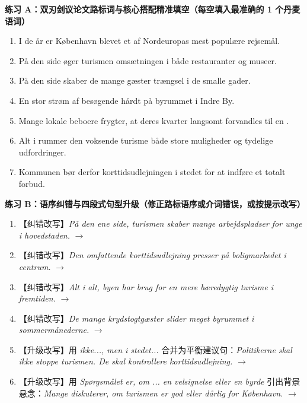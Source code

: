 \textbf{练习 A：双刃剑议论文路标词与核心搭配精准填空（每空填入最准确的 1 个丹麦语词）}
\begin{enumerate}
  \item I de \underline{\hspace{2.2cm}} år er København blevet et af Nordeuropas mest populære rejsemål.
  \item På den \underline{\hspace{2.2cm}} side øger turismen omsætningen i både restauranter og museer.
  \item På den \underline{\hspace{2.2cm}} side skaber de mange gæster trængsel i de smalle gader.
  \item En stor strøm af besøgende \underline{\hspace{2.2cm}} hårdt på byrummet i Indre By.
  \item Mange lokale beboere frygter, at deres kvarter langsomt forvandles til en \underline{\hspace{2.2cm}}.
  \item Alt i \underline{\hspace{2.2cm}} rummer den voksende turisme både store muligheder og tydelige udfordringer.
  \item Kommunen bør derfor \underline{\hspace{2.2cm}} korttidsudlejningen i stedet for at indføre et totalt forbud.
\end{enumerate}

\textbf{练习 B：语序纠错与四段式句型升级（修正路标语序或介词错误，或按提示改写）}
\begin{enumerate}
  \item 【纠错改写】\textit{På den ene side, turismen skaber mange arbejdspladser for unge i hovedstaden.} $\rightarrow$
  \item 【纠错改写】\textit{Den omfattende korttidsudlejning presser på boligmarkedet i centrum.} $\rightarrow$
  \item 【纠错改写】\textit{Alt i alt, byen har brug for en mere bæredygtig turisme i fremtiden.} $\rightarrow$
  \item 【纠错改写】\textit{De mange krydstogtgæster slider meget byrummet i sommermånederne.} $\rightarrow$
  \item 【升级改写】用 \textit{ikke..., men i stedet...} 合并为平衡建议句：\textit{Politikerne skal ikke stoppe turismen. De skal kontrollere korttidsudlejning.} $\rightarrow$
  \item 【升级改写】用 \textit{Spørgsmålet er, om ... en velsignelse eller en byrde} 引出背景悬念：\textit{Mange diskuterer, om turismen er god eller dårlig for København.} $\rightarrow$
\end{enumerate}

